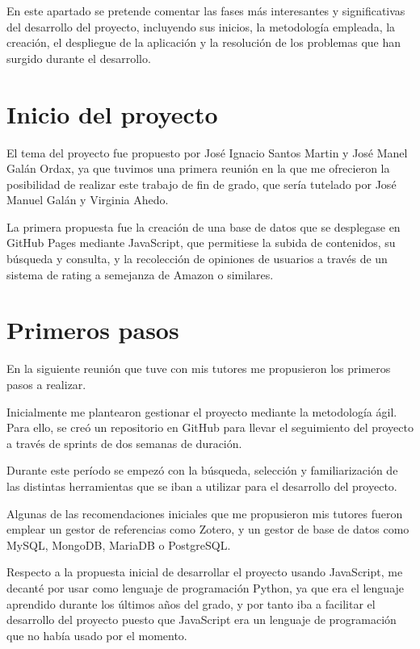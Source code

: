 
En este apartado se pretende comentar las fases más interesantes y significativas del desarrollo del proyecto, incluyendo sus inicios, la metodología empleada, la creación, el despliegue de la aplicación y la resolución de los problemas que han surgido durante el desarrollo. 


\section{Inicio del proyecto}
El tema del proyecto fue propuesto por José Ignacio Santos Martin y José Manel Galán Ordax, ya que tuvimos una primera reunión en la que me ofrecieron la posibilidad de realizar este trabajo de fin de grado, que sería tutelado por José Manuel Galán y Virginia Ahedo.

La primera propuesta fue la creación de una base de datos que se desplegase en GitHub Pages mediante JavaScript, que permitiese la subida de contenidos, su búsqueda y consulta, y la recolección de opiniones de usuarios a través de un sistema de rating a semejanza de Amazon o similares.

\section {Primeros pasos}
En la siguiente reunión que tuve con mis tutores me propusieron los primeros pasos a realizar. 

Inicialmente me plantearon gestionar el proyecto mediante la metodología ágil. Para ello, se creó un repositorio en GitHub para llevar el seguimiento del proyecto a través de sprints de dos semanas de duración.

Durante este período se empezó con la búsqueda, selección y familiarización de las distintas herramientas que se iban a utilizar para el desarrollo del proyecto. 

Algunas de las recomendaciones iniciales que me propusieron mis tutores fueron emplear un gestor de referencias como Zotero, y un gestor de base de datos como MySQL, MongoDB, MariaDB o PostgreSQL.

Respecto a la propuesta inicial de desarrollar el proyecto usando JavaScript, me decanté por usar como lenguaje de programación Python, ya que era el lenguaje aprendido durante los últimos años del grado, y por tanto iba a facilitar el desarrollo del proyecto puesto que JavaScript era un lenguaje de programación que no había usado por el momento.

